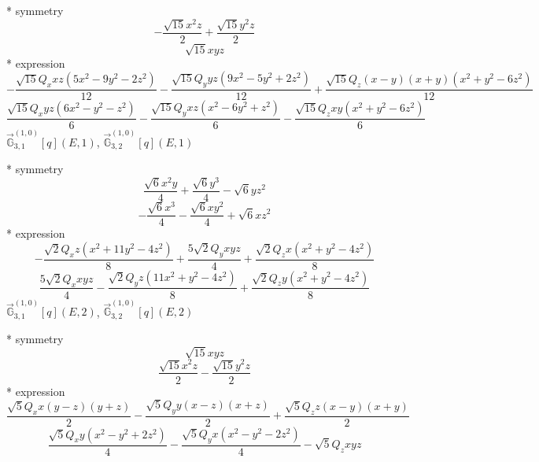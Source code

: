 \documentclass[fleqn,8pt]{jsarticle}
\begin{document}
\noindent\quad ** symmetry
\begin{dmath*}
- \frac{\sqrt{15} x^{2} z}{2} + \frac{\sqrt{15} y^{2} z}{2}
\end{dmath*}
\begin{dmath*}
\sqrt{15} x y z
\end{dmath*}
\noindent\quad ** expression
\begin{dmath*}
- \frac{\sqrt{15} Q_{x} x z \left(5 x^{2} - 9 y^{2} - 2 z^{2}\right)}{12} - \frac{\sqrt{15} Q_{y} y z \left(9 x^{2} - 5 y^{2} + 2 z^{2}\right)}{12} + \frac{\sqrt{15} Q_{z} \left(x - y\right) \left(x + y\right) \left(x^{2} + y^{2} - 6 z^{2}\right)}{12}
\end{dmath*}
\begin{dmath*}
\frac{\sqrt{15} Q_{x} y z \left(6 x^{2} - y^{2} - z^{2}\right)}{6} - \frac{\sqrt{15} Q_{y} x z \left(x^{2} - 6 y^{2} + z^{2}\right)}{6} - \frac{\sqrt{15} Q_{z} x y \left(x^{2} + y^{2} - 6 z^{2}\right)}{6}
\end{dmath*}
\noindent\quad $\vec{\mathbb{G}}_{3,1}^{(1,0)}[q](E,1)$, $\vec{\mathbb{G}}_{3,2}^{(1,0)}[q](E,1)$

\noindent\quad ** symmetry
\begin{dmath*}
\frac{\sqrt{6} x^{2} y}{4} + \frac{\sqrt{6} y^{3}}{4} - \sqrt{6} y z^{2}
\end{dmath*}
\begin{dmath*}
- \frac{\sqrt{6} x^{3}}{4} - \frac{\sqrt{6} x y^{2}}{4} + \sqrt{6} x z^{2}
\end{dmath*}
\noindent\quad ** expression
\begin{dmath*}
- \frac{\sqrt{2} Q_{x} z \left(x^{2} + 11 y^{2} - 4 z^{2}\right)}{8} + \frac{5 \sqrt{2} Q_{y} x y z}{4} + \frac{\sqrt{2} Q_{z} x \left(x^{2} + y^{2} - 4 z^{2}\right)}{8}
\end{dmath*}
\begin{dmath*}
\frac{5 \sqrt{2} Q_{x} x y z}{4} - \frac{\sqrt{2} Q_{y} z \left(11 x^{2} + y^{2} - 4 z^{2}\right)}{8} + \frac{\sqrt{2} Q_{z} y \left(x^{2} + y^{2} - 4 z^{2}\right)}{8}
\end{dmath*}
\noindent\quad $\vec{\mathbb{G}}_{3,1}^{(1,0)}[q](E,2)$, $\vec{\mathbb{G}}_{3,2}^{(1,0)}[q](E,2)$

\noindent\quad ** symmetry
\begin{dmath*}
\sqrt{15} x y z
\end{dmath*}
\begin{dmath*}
\frac{\sqrt{15} x^{2} z}{2} - \frac{\sqrt{15} y^{2} z}{2}
\end{dmath*}
\noindent\quad ** expression
\begin{dmath*}
\frac{\sqrt{5} Q_{x} x \left(y - z\right) \left(y + z\right)}{2} - \frac{\sqrt{5} Q_{y} y \left(x - z\right) \left(x + z\right)}{2} + \frac{\sqrt{5} Q_{z} z \left(x - y\right) \left(x + y\right)}{2}
\end{dmath*}
\begin{dmath*}
\frac{\sqrt{5} Q_{x} y \left(x^{2} - y^{2} + 2 z^{2}\right)}{4} - \frac{\sqrt{5} Q_{y} x \left(x^{2} - y^{2} - 2 z^{2}\right)}{4} - \sqrt{5} Q_{z} x y z
\end{dmath*}
\end{document}
